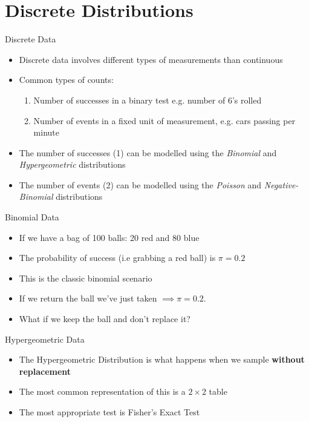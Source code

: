 \documentclass[aspectratio=169,11pt]{beamer}
\begin{document}
\section{Discrete Distributions}

\begin{frame}{Discrete Data}

	\begin{itemize}
		\item Discrete data involves different types of measurements than continuous
		\item Common types of counts:
		\begin{enumerate}%
			\item Number of successes in a binary test e.g. number of 6's rolled
			\item Number of events in a fixed unit of measurement, e.g. cars passing per minute
		\end{enumerate}
		\pause
		\item The number of successes (1) can be modelled using the \textit{Binomial} and \textit{Hypergeometric} distributions
		\item The number of events (2) can be modelled using the \textit{Poisson} and \textit{Negative-Binomial} distributions
	\end{itemize}

\end{frame}

\begin{frame}{Binomial Data}

	\begin{itemize}
		\item If we have a bag of 100 balls: 20 red and 80 blue
		\item The probability of success (i.e grabbing a red ball) is $\pi = 0.2$
		\item This is the classic binomial scenario
		\item If we return the ball we've just taken $\implies \pi = 0.2$.
		\item What if we keep the ball and don't replace it?
	\end{itemize}

\end{frame}


\begin{frame}{Hypergeometric Data}

	\begin{itemize}
		\item The Hypergeometric Distribution is what happens when we sample \textbf{without replacement}
		\item The most common representation of this is a $2\times2$ table
		\item The most appropriate test is Fisher's Exact Test
	\end{itemize}

\end{frame}
\end{document}
